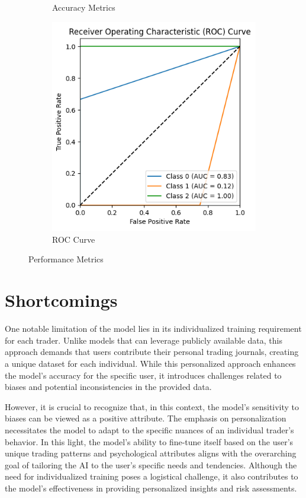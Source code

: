 \documentclass{article}
\begin{document}
\begin{figure}[h]
\begin{subfigure}[b]{0.3\textwidth}
        \caption{Accuracy Metrics}
        \label{fig:figure2}
    \end{subfigure}
    \hspace{1cm} %
    \begin{subfigure}[b]{0.3\textwidth}
        \includegraphics[width=\textwidth]{roc_class_curve.png}
        \caption{ROC Curve}
        \label{fig:figure3}
    \end{subfigure}
    \caption{Performance Metrics}
    \label{fig:overall}
\end{figure}


\section{Shortcomings}
One notable limitation of the model lies in its individualized training requirement for each trader. Unlike models that can leverage publicly available data, this approach demands that users contribute their personal trading journals, creating a unique dataset for each individual. While this personalized approach enhances the model's accuracy for the specific user, it introduces challenges related to biases and potential inconsistencies in the provided data.

However, it is crucial to recognize that, in this context, the model's sensitivity to biases can be viewed as a positive attribute. The emphasis on personalization necessitates the model to adapt to the specific nuances of an individual trader's behavior. In this light, the model's ability to fine-tune itself based on the user's unique trading patterns and psychological attributes aligns with the overarching goal of tailoring the AI to the user's specific needs and tendencies. Although the need for individualized training poses a logistical challenge, it also contributes to the model's effectiveness in providing personalized insights and risk assessments.
\end{document}
